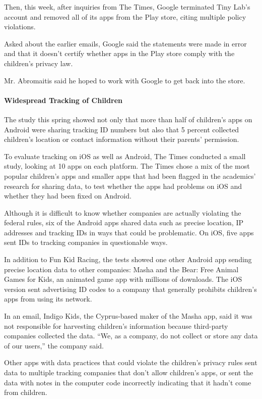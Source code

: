 Then, this week, after inquiries from The Times, Google terminated Tiny
Lab's account and removed all of its apps from the Play store, citing
multiple policy violations.

Asked about the earlier emails, Google said the statements were made in
error and that it doesn't certify whether apps in the Play store comply
with the children's privacy law.

Mr. Abromaitis said he hoped to work with Google to get back into the
store.

\hypertarget{widespread-tracking-of-children}{%
\paragraph{Widespread Tracking of
Children}\label{widespread-tracking-of-children}}

The study this spring showed not only that more than half of children's
apps on Android were sharing tracking ID numbers but also that 5 percent
collected children's location or contact information without their
parents' permission.

To evaluate tracking on iOS as well as Android, The Times conducted a
small study, looking at 10 apps on each platform. The Times chose a mix
of the most popular children's apps and smaller apps that had been
flagged in the academics' research for sharing data, to test whether the
apps had problems on iOS and whether they had been fixed on Android.

Although it is difficult to know whether companies are actually
violating the federal rules, six of the Android apps shared data such as
precise location, IP addresses and tracking IDs in ways that could be
problematic. On iOS, five apps sent IDs to tracking companies in
questionable ways.

In addition to Fun Kid Racing, the tests showed one other Android app
sending precise location data to other companies: Masha and the Bear:
Free Animal Games for Kids, an animated game app with millions of
downloads. The iOS version sent advertising ID codes to a company that
generally prohibits children's apps from using its network.

In an email, Indigo Kids, the Cyprus-based maker of the Masha app, said
it was not responsible for harvesting children's information because
third-party companies collected the data. ``We, as a company, do not
collect or store any data of our users,'' the company said.

Other apps with data practices that could violate the children's privacy
rules sent data to multiple tracking companies that don't allow
children's apps, or sent the data with notes in the computer code
incorrectly indicating that it hadn't come from children.


